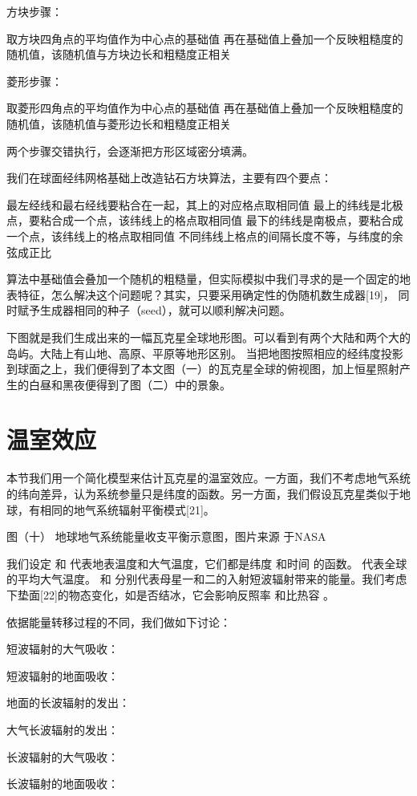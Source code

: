 \documentclass[a4paper,10.5pt]{book}
\begin{document}
方块步骤：

取方块四角点的平均值作为中心点的基础值
再在基础值上叠加一个反映粗糙度的随机值，该随机值与方块边长和粗糙度正相关

菱形步骤：

取菱形四角点的平均值作为中心点的基础值
再在基础值上叠加一个反映粗糙度的随机值，该随机值与菱形边长和粗糙度正相关

两个步骤交错执行，会逐渐把方形区域密分填满。

我们在球面经纬网格基础上改造钻石方块算法，主要有四个要点：

最左经线和最右经线要粘合在一起，其上的对应格点取相同值
最上的纬线是北极点，要粘合成一个点，该纬线上的格点取相同值
最下的纬线是南极点，要粘合成一个点，该纬线上的格点取相同值
不同纬线上格点的间隔长度不等，与纬度的余弦成正比

算法中基础值会叠加一个随机的粗糙量，但实际模拟中我们寻求的是一个固定的地表特征，怎么解决这个问题呢？其实，只要采用确定性的伪随机数生成器[19]，
同时赋予生成器相同的种子（seed），就可以顺利解决问题。

下图就是我们生成出来的一幅瓦克星全球地形图。可以看到有两个大陆和两个大的岛屿。大陆上有山地、高原、平原等地形区别。
当把地图按照相应的经纬度投影到球面之上，我们便得到了本文图（一）的瓦克星全球的俯视图，加上恒星照射产生的白昼和黑夜便得到了图（二）中的景象。

\section{温室效应}

本节我们用一个简化模型来估计瓦克星的温室效应。一方面，我们不考虑地气系统的纬向差异，认为系统参量只是纬度的函数。另一方面，我们假设瓦克星类似于地球，有相同的地气系统辐射平衡模式[21]。


图（十）
地球地气系统能量收支平衡示意图，图片来源 于NASA

我们设定  和  代表地表温度和大气温度，它们都是纬度  和时间  的函数。   代表全球的平均大气温度。 和   分别代表母星一和二的入射短波辐射带来的能量。我们考虑下垫面[22]的物态变化，如是否结冰，它会影响反照率  和比热容  。

依据能量转移过程的不同，我们做如下讨论：

短波辐射的大气吸收：

短波辐射的地面吸收：

地面的长波辐射的发出：

大气长波辐射的发出：

长波辐射的大气吸收：

长波辐射的地面吸收：
\end{document}
